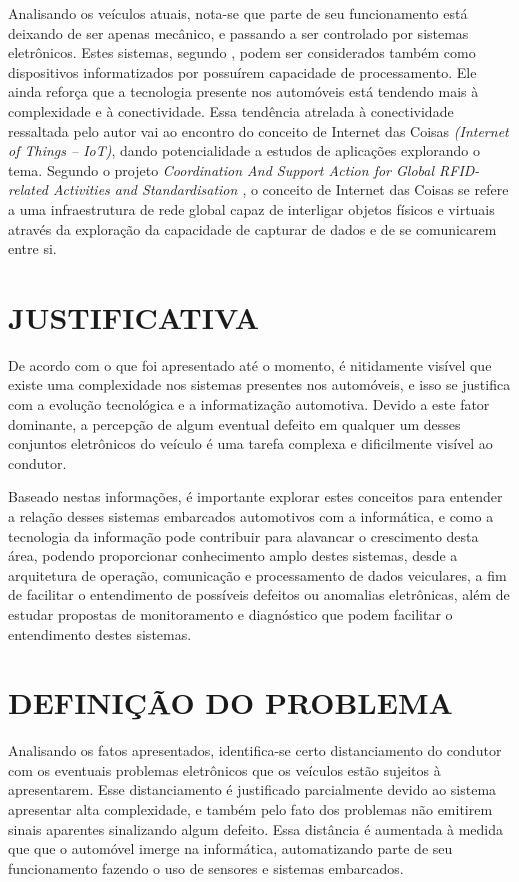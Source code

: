Analisando os veículos atuais, nota-se que parte de seu funcionamento está deixando de ser apenas mecânico, e passando a ser controlado por sistemas eletrônicos. Estes sistemas, segundo , podem ser considerados também como dispositivos informatizados por possuírem capacidade de processamento. Ele ainda reforça que a tecnologia presente nos automóveis está tendendo mais à complexidade e à conectividade. Essa tendência atrelada à conectividade ressaltada pelo autor vai ao encontro do conceito de Internet das Coisas \textit{(Internet of Things – IoT)}, dando potencialidade a estudos de aplicações explorando o tema. Segundo o projeto \textit{Coordination And Support Action for Global RFID-related Activities and Standardisation \cite{casagras}}, o conceito de Internet das Coisas se refere a uma infraestrutura de rede global capaz de interligar objetos físicos e virtuais através da exploração da capacidade de capturar de dados e de se comunicarem entre si.

\section{JUSTIFICATIVA}
De acordo com o que foi apresentado até o momento, é nitidamente visível que existe uma complexidade nos sistemas presentes nos automóveis, e isso se justifica com a evolução tecnológica e a informatização automotiva. Devido a este fator dominante, a percepção de algum eventual defeito em qualquer um desses conjuntos eletrônicos do veículo é uma tarefa complexa e dificilmente visível ao condutor.

Baseado nestas informações, é importante explorar estes conceitos para entender a relação desses sistemas embarcados automotivos com a informática, e como a tecnologia da informação pode contribuir para alavancar o crescimento desta área, podendo proporcionar conhecimento amplo destes sistemas, desde a arquitetura de operação, comunicação e processamento de dados veiculares, a fim de facilitar o entendimento de possíveis defeitos ou anomalias eletrônicas, além de estudar propostas de monitoramento e diagnóstico que podem facilitar o entendimento destes sistemas.

\section{DEFINIÇÃO DO PROBLEMA}
Analisando os fatos apresentados, identifica-se certo distanciamento do condutor com os eventuais problemas eletrônicos que os veículos estão sujeitos à apresentarem. Esse distanciamento é justificado parcialmente devido ao sistema apresentar alta complexidade, e também pelo fato dos problemas não emitirem sinais aparentes sinalizando algum defeito. Essa distância é aumentada à medida que que o automóvel imerge na informática, automatizando parte de seu funcionamento fazendo o uso de sensores e sistemas embarcados.

